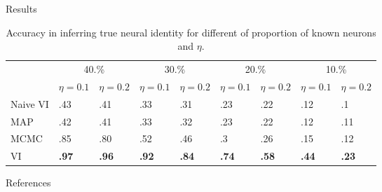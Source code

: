 \documentclass[final]{beamer}
\begin{document}
\begin{frame}[allowframebreaks]
\begin{minipage}[htp][1\textheight][t]{\textwidth}
\begin{columns}[t]
\begin{column}{.5\linewidth}
\begin{block}{Results}
\begin{table}[t]
  \caption{Accuracy in inferring true neural identity for different of
    proportion of known neurons and $\eta$.
  }
   \label{table:celegans}
   \centering
   \begin{tabular}{lllllllll}
    & \multicolumn{2}{c}{40.\%} & \multicolumn{2}{c}{30.\%} & \multicolumn{2}{c}{20.\%} & \multicolumn{2}{c}{10.\%}\\
    \cmidrule(lr){2-3} \cmidrule(lr){4-5} \cmidrule(lr){6-7} \cmidrule(lr){8-9}
    & $\eta=0.1$ & $\eta=0.2$ & $\eta=0.1$ & $\eta=0.2$  & $\eta=0.1$ & $\eta=0.2$  & $\eta=0.1$ & $\eta=0.2$ \\
    \midrule 
    Naive VI & .43 & .41 & .33 & .31 & .23 & .22 & .12 & .1 \\
    MAP & .42 & .41  &.33 &.32& .23 & .22 & .12 & .11 \\
    MCMC   & .85 & .80  &.52 &.46& .3 & .26 & .15 & .12 \\
    VI   & \textbf{.97} & \textbf{.96} & \textbf{.92} & \textbf{.84} & \textbf{.74} & \textbf{.58} & \textbf{.44} & \textbf{.23} \\
              \bottomrule
   \end{tabular}
\end{table}
\end{block}

   
	     \begin{block}{References}
	     \scriptsize
		



	\end{block}
	     	   		     

	     \end{column}
	     
            
            
            
	\end{columns}
      \end{minipage}
      
       
       

      
\end{frame}
\end{document}
